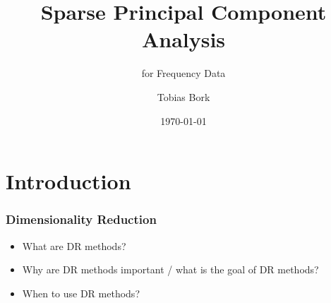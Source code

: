 \documentclass{beamer}
\theoremstyle{plain}
\theoremstyle{definition}
\begin{document}
\title{Sparse Principal Component Analysis}
\subtitle{for Frequency Data}   
\author{Tobias Bork} 
\date{\today}

\begin{frame}
\titlepage
\end{frame}



\section{Introduction} 
\begin{frame}
\frametitle{Dimensionality Reduction} 

\begin{itemize}
\item What are DR methods?
\item Why are DR methods important / what is the goal of DR methods?
\item When to use DR methods?

\end{itemize}
\end{frame}
\end{document}
